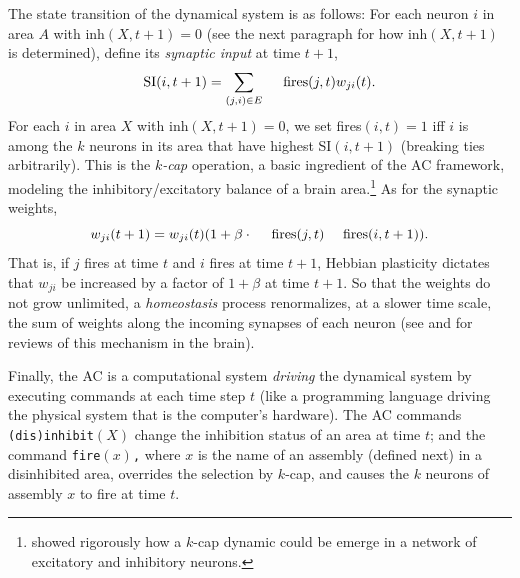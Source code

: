 \documentclass[final,12pt]{colt2022} %
\begin{document}
The state transition of the dynamical system is as follows: For each neuron $i$ in area $A$ with inh$(X,t+1)=0$ (see the next paragraph for how inh$(X,t+1)$ is determined), define its {\em synaptic input} at time $t+1$, 
\[
\mbox{SI}(i,t+1) = \sum_{(j,i)\in E} \hbox{\rm fires}(j,t)w_{ji}(t).
\]
For each $i$ in area $X$ with inh$(X,t+1)=0$, we set fires$(i,t)=1$ iff $i$ is among the $k$ neurons in its area that have highest SI$(i,t+1)$ (breaking ties arbitrarily).  This is the {\em $k$-cap} operation, a basic ingredient of the AC framework, modeling the inhibitory/excitatory balance of a brain area.\footnote{\citet{binas2014learning} showed rigorously how a $k$-cap dynamic could be emerge in a network of excitatory and inhibitory neurons.}  As for the synaptic weights, 
\[
w_{ji}(t+1)=w_{ji}(t)(1+\beta\cdot\hbox{\rm fires}(j,t)\hbox{\rm fires}(i,t+1)).
\]
That is, if $j$ fires at time $t$ and $i$ fires at time $t+1$, Hebbian plasticity dictates that $w_{ji}$ be increased by a factor of $1+\beta$ at time $t+1$. So that the weights do not grow unlimited, a {\em homeostasis} process renormalizes, at a slower time scale, the sum of weights along the incoming synapses of each neuron (see \citet{davis2006homeostatic} and \citet{turrigiano2011too} for reviews of this mechanism in the brain).

Finally, the AC is a computational system {\em driving} the dynamical system by executing commands at each time step $t$ (like a programming language driving the physical system that is the computer's hardware).  The AC commands {\tt (dis)inhibit$(X)$} change the inhibition status of an area at time $t$; and the command {\tt fire$(x)$,} where $x$ is the name of an assembly (defined next) in a disinhibited area, overrides the selection by $k$-cap, and causes the $k$ neurons of assembly $x$ to fire at time $t$.  
\end{document}
